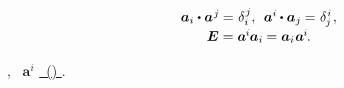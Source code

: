 \nopagebreak\vspace{-0.3em}
\begin{equation}\label{fundamentalpropertyofcobasis}
\begin{array}{c}
\bm{a}_i \dotp \bm{a}^{\hspace{.1ex}j} \hspace{-0.1ex} = \hspace{.1ex} \delta_i^{\hspace{.1ex}j} , \:\:
\bm{a}^{i} \hspace{-0.1ex} \dotp \bm{a}_j \hspace{-0.1ex} = \hspace{.1ex} \delta_{\hspace{-0.1ex}j}^{\hspace{.1ex}i}
\hspace{.16ex} ,
\\[.2em]
\UnitDyad = \bm{a}^{\hspace{-0.1ex}i} \hspace{-0.1ex} \bm{a}_i \hspace{-0.1ex} = \bm{a}_i \hspace{.1ex} \bm{a}^{\hspace{-0.1ex}i}
\hspace{-0.2ex} .
\end{array}
\end{equation}

\vspace{-0.3em}\noindent
{},
~${\bm{a}^{i}}$
\href{https://en.wikipedia.org/wiki/Dual_basis}{~() }.

